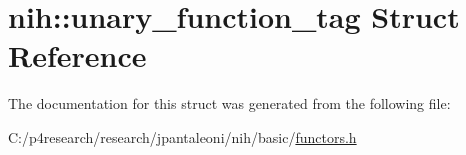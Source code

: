 \hypertarget{structnih_1_1unary__function__tag}{
\section{nih\-:\-:unary\-\_\-function\-\_\-tag \-Struct \-Reference}
\label{structnih_1_1unary__function__tag}
}


\-The documentation for this struct was generated from the following file\-:\begin{DoxyCompactItemize}
\item 
\-C\-:/p4research/research/jpantaleoni/nih/basic/\hyperlink{functors_8h}{functors.\-h}\end{DoxyCompactItemize}

